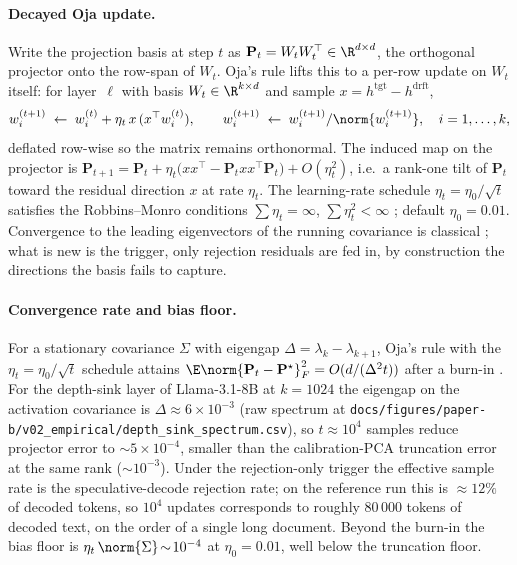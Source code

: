 \documentclass[11pt]{article}
\providecommand{\Pmat}{\mathbf{P}}
\begin{document}
\paragraph{Decayed Oja update.}  Write the projection basis at step $t$ as
$\Pmat_t=W_tW_t^\top\in\R^{d\times d}$, the orthogonal projector onto
the row-span of $W_t$. Oja's rule lifts this to a per-row update on
$W_t$ itself: for layer~$\ell$ with basis $W_t\in\R^{k\times d}$ and
sample $x=h^\text{tgt}-h^\text{drft}$,
\begin{equation}
w_i^{(t+1)} \;\leftarrow\; w_i^{(t)} + \eta_t\,x\,(x^\top w_i^{(t)}),
\qquad w_i^{(t+1)} \;\leftarrow\; w_i^{(t+1)}/\norm{w_i^{(t+1)}},
\quad i=1,\dots,k,
\label{eq:oja}
\end{equation}
deflated row-wise so the matrix remains orthonormal. The induced map on
the projector is
$\Pmat_{t+1}=\Pmat_t+\eta_t\bigl(xx^\top-\Pmat_t xx^\top\Pmat_t\bigr)+O(\eta_t^2)$,
i.e.\ a rank-one tilt of $\Pmat_t$ toward the residual direction $x$ at
rate $\eta_t$. The learning-rate schedule $\eta_t=\eta_0/\sqrt t$
satisfies the Robbins--Monro conditions $\sum\eta_t=\infty$,
$\sum\eta_t^2<\infty$ \cite{robbins1951sa}; default $\eta_0=0.01$.
Convergence to the leading eigenvectors of the running covariance is
classical \cite{oja1982}; what is new is the trigger, only rejection
residuals are fed in, by construction the directions the basis fails to
capture.

\paragraph{Convergence rate and bias floor.}
For a stationary covariance $\Sigma$ with eigengap
$\Delta=\lambda_k-\lambda_{k+1}$, Oja's rule with the
$\eta_t=\eta_0/\sqrt t$ schedule attains
$\E\norm{\Pmat_t-\Pmat^\star}_F^2 = O(d/(\Delta^2 t))$ after a burn-in
\cite{allen2017first,jain2016streaming}. For the depth-sink layer of
Llama-3.1-8B at $k{=}1024$ the eigengap on the activation covariance is
$\Delta\approx 6\times 10^{-3}$ (raw spectrum at
\texttt{docs/figures/paper-b/v02\_empirical/depth\_sink\_spectrum.csv}),
so $t\!\approx\!10^4$ samples reduce projector error to
$\sim 5\times 10^{-4}$, smaller than the calibration-PCA truncation
error at the same rank ($\sim 10^{-3}$). Under the rejection-only
trigger the effective sample rate is the speculative-decode rejection
rate; on the reference run this is $\approx 12\%$ of decoded tokens, so
$10^4$ updates corresponds to roughly $80\,000$ tokens of decoded text,
on the order of a single long document. Beyond the burn-in the bias
floor is $\eta_t\,\norm{\Sigma}\!\sim\!10^{-4}$ at $\eta_0{=}0.01$, well
below the truncation floor.
\end{document}
